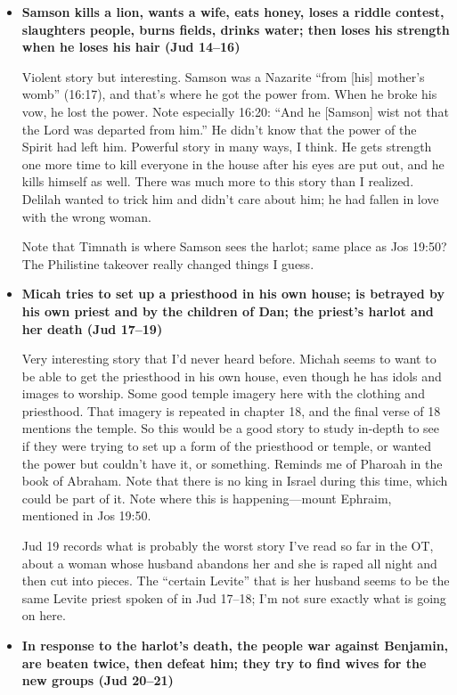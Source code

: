 \begin{itemize}
\item \textbf{Samson kills a lion, wants a wife, eats honey, loses a riddle contest, slaughters people, burns fields, drinks water; then loses his strength when he loses his hair (Jud 14--16)}

	Violent story but interesting. Samson was a Nazarite ``from [his] mother's womb'' (16:17), and that's where he got the power from. When he broke his vow, he lost the power. Note especially 16:20: ``And he [Samson] wist not that the Lord was departed from him.'' He didn't know that the power of the Spirit had left him. Powerful story in many ways, I think. He gets strength one more time to kill everyone in the house after his eyes are put out, and he kills himself as well. There was much more to this story than I realized. Delilah wanted to trick him and didn't care about him; he had fallen in love with the wrong woman.
	
	Note that Timnath is where Samson sees the harlot; same place as Jos 19:50? The Philistine takeover really changed things I guess.

\item \textbf{Micah tries to set up a priesthood in his own house; is betrayed by his own priest and by the children of Dan; the priest's harlot and her death (Jud 17--19)}

	Very interesting story that I'd never heard before. Michah seems to want to be able to get the priesthood in his own house, even though he has idols and images to worship. Some good temple imagery here with the clothing and priesthood. That imagery is repeated in chapter 18, and the final verse of 18 mentions the temple. So this would be a good story to study in-depth to see if they were trying to set up a form of the priesthood or temple, or wanted the power but couldn't have it, or something. Reminds me of Pharoah in the book of Abraham. Note that there is no king in Israel during this time, which could be part of it.
	Note where this is happening---mount Ephraim, mentioned in Jos 19:50.

	Jud 19 records what is probably the worst story I've read so far in the OT, about a woman whose husband abandons her and she is raped all night and then cut into pieces. The ``certain Levite'' that is her husband seems to be the same Levite priest spoken of in Jud 17--18; I'm not sure exactly what is going on here.
	
\item \textbf{In response to the harlot's death, the people war against Benjamin, are beaten twice, then defeat him; they try to find wives for the new groups (Jud 20--21)}


\end{itemize}
